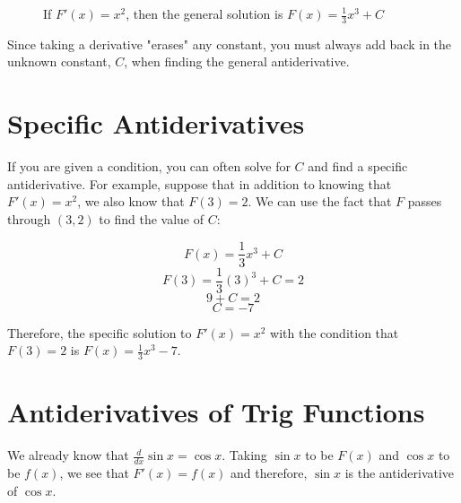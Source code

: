 \begin{figure}[H]
	\centering
	\caption{If $F'(x) = x^2$, then the general solution is $F(x) = \frac{1}{3}x^3+C$}
	\label{fig:antideriv}
\end{figure} 

Since taking a derivative "erases" any constant, you must always add 
back in the unknown constant, $C$, when finding the general 
antiderivative. 

\section{Specific Antiderivatives}
If you are given a condition, you can often solve for $C$ and find a 
specific antiderivative. For example, suppose that in addition to 
knowing that $F'(x) = x^2$, we also know that $F(3) = 2$. We can use 
the fact that $F$ passes through $(3, 2)$ to find the value of $C$:

$$F(x) = \frac{1}{3} x^3 + C$$
$$F(3) = \frac{1}{3} (3)^3 + C = 2$$ $$9 + C = 2$$
$$C = -7$$

Therefore, the specific solution to $F'(x) = x^2$ with the condition 
that $F(3) =2$ is $F(x) = \frac{1}{3} x^3 - 7$. 

\section{Antiderivatives of Trig Functions}
We already know that $\frac{d}{dx} \sin{x} = \cos{x}$. Taking $\sin{x}$ 
to be $F(x)$ and $\cos{x}$ to be $f(x)$, we see that $F'(x) = f(x)$ 
and therefore, $\sin{x}$ is the antiderivative of $\cos{x}$. 

